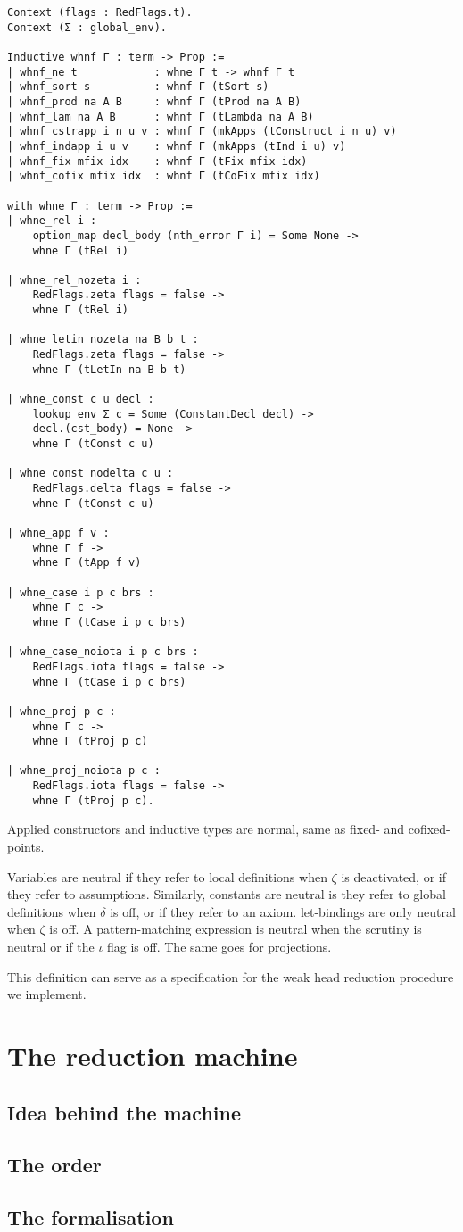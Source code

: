 \begin{verbatim}
Context (flags : RedFlags.t).
Context (Σ : global_env).

Inductive whnf Γ : term -> Prop :=
| whnf_ne t            : whne Γ t -> whnf Γ t
| whnf_sort s          : whnf Γ (tSort s)
| whnf_prod na A B     : whnf Γ (tProd na A B)
| whnf_lam na A B      : whnf Γ (tLambda na A B)
| whnf_cstrapp i n u v : whnf Γ (mkApps (tConstruct i n u) v)
| whnf_indapp i u v    : whnf Γ (mkApps (tInd i u) v)
| whnf_fix mfix idx    : whnf Γ (tFix mfix idx)
| whnf_cofix mfix idx  : whnf Γ (tCoFix mfix idx)

with whne Γ : term -> Prop :=
| whne_rel i :
    option_map decl_body (nth_error Γ i) = Some None ->
    whne Γ (tRel i)

| whne_rel_nozeta i :
    RedFlags.zeta flags = false ->
    whne Γ (tRel i)

| whne_letin_nozeta na B b t :
    RedFlags.zeta flags = false ->
    whne Γ (tLetIn na B b t)

| whne_const c u decl :
    lookup_env Σ c = Some (ConstantDecl decl) ->
    decl.(cst_body) = None ->
    whne Γ (tConst c u)

| whne_const_nodelta c u :
    RedFlags.delta flags = false ->
    whne Γ (tConst c u)

| whne_app f v :
    whne Γ f ->
    whne Γ (tApp f v)

| whne_case i p c brs :
    whne Γ c ->
    whne Γ (tCase i p c brs)

| whne_case_noiota i p c brs :
    RedFlags.iota flags = false ->
    whne Γ (tCase i p c brs)

| whne_proj p c :
    whne Γ c ->
    whne Γ (tProj p c)

| whne_proj_noiota p c :
    RedFlags.iota flags = false ->
    whne Γ (tProj p c).
\end{verbatim}

Applied constructors and inductive types are normal, same as fixed- and
cofixed-points.

Variables are neutral if they refer to local definitions when \(\zeta\) is
deactivated, or if they refer to assumptions.
Similarly, constants are neutral is they refer to global definitions when
\(\delta\) is off, or if they refer to an axiom.
let-bindings are only neutral when \(\zeta\) is off.
A pattern-matching expression is neutral when the scrutiny is neutral or if the
\(\iota\) flag is off. The same goes for projections.

This definition can serve as a specification for the weak head reduction
procedure we implement.

\section{The reduction machine}

\subsection{Idea behind the machine}

\subsection{The order}

\subsection{The \Coq formalisation}